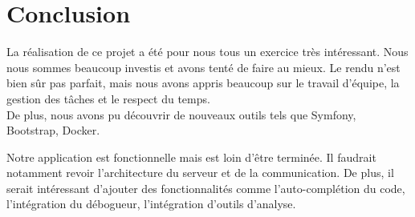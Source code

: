 \chapter{Conclusion}

\par La réalisation de ce projet a été pour nous tous un exercice très intéressant. Nous nous sommes beaucoup investis et avons tenté de faire au mieux. Le rendu n'est bien sûr pas parfait, mais nous avons appris beaucoup sur le travail d'équipe, la gestion des tâches et le respect du temps.\\
De plus, nous avons pu découvrir de nouveaux outils tels que Symfony, Bootstrap, Docker. \\

\par Notre application est fonctionnelle mais est loin d'être terminée. Il faudrait notamment revoir l'architecture du serveur et de la communication. De plus, il serait intéressant d'ajouter des fonctionnalités comme l'auto-complétion du code, l’intégration du débogueur, l'intégration d’outils d’analyse.